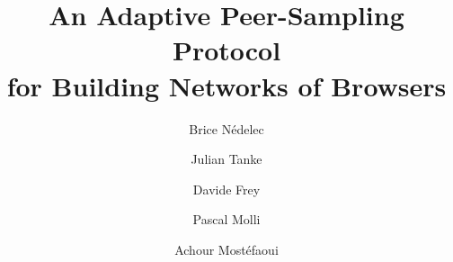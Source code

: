 \documentclass[onecolumn, a4paper]{svjour3}
\begin{document}
\title{An Adaptive Peer-Sampling Protocol\\for Building Networks of Browsers}


\author{Brice N\'edelec \and Julian Tanke \and Davide Frey \and Pascal Molli
  \and Achour Most\'efaoui}


\date{}
\end{document}
